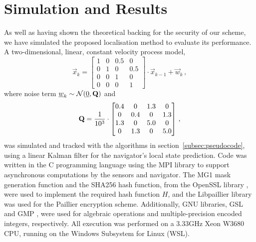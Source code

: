 \documentclass[10pt,letterpaper,oneside,twocolumn,journal]{IEEEtran}
\theoremstyle{definition}
\theoremstyle{definition}
\theoremstyle{remark}
\begin{document}
\section{Simulation and Results} \label{sec:sim_and_results}
As well as having shown the theoretical backing for the security of our scheme, we have simulated the proposed localisation method to evaluate its performance. A two-dimensional, linear, constant velocity process model,
\begin{equation*}
    \vec{x}_{k} = 
    \begin{bmatrix}
        1 & 0 & 0.5 & 0\\
        0 & 1 & 0 & 0.5\\
        0 & 0 & 1 & 0\\
        0 & 0 & 0 & 1
    \end{bmatrix} \cdot \vec{x}_{k-1} + \vec{w}_k\,,
\end{equation*}
where noise term ${\underline{w}}_k \sim \mathcal{N}({\underline{0}}, {{\mathbf{Q}}})$ and
\begin{equation*}
    {\ensuremath{{\mathbf{Q}}}} = \frac{1}{10^3} \cdot
    \begin{bmatrix}
        0.4 & 0 & 1.3 & 0\\
        0 & 0.4 & 0 & 1.3\\
        1.3 & 0 & 5.0 & 0\\
        0 & 1.3 & 0 & 5.0
    \end{bmatrix}\,,
\end{equation*}
was simulated and tracked with the algorithms in section~\ref{subsec:pseudocode}, using a linear Kalman filter for the navigator's local state prediction. Code was written in the C programming language using the MPI library \cite{theopenmpiprojectOpenMPI2020} to support asynchronous computations by the sensors and navigator. The MG1 mask generation function and the SHA256 hash function, from the OpenSSL library \cite{theopensslprojectOpenSSL2020}, were used to implement the required hash function $H$, and the Libpaillier library \cite{bethencourtLibpaillier2010} was used for the Paillier encryption scheme. Additionally, GNU libraries, GSL \cite{thegsldevelopmentteamGSLGNUScientific2019} and GMP \cite{granlundGMPGNUMultiple2020}, were used for algebraic operations and multiple-precision encoded integers, respectively. All execution was performed on a 3.33GHz Xeon W3680 CPU, running on the Windows Subsystem for Linux (WSL).
\end{document}
